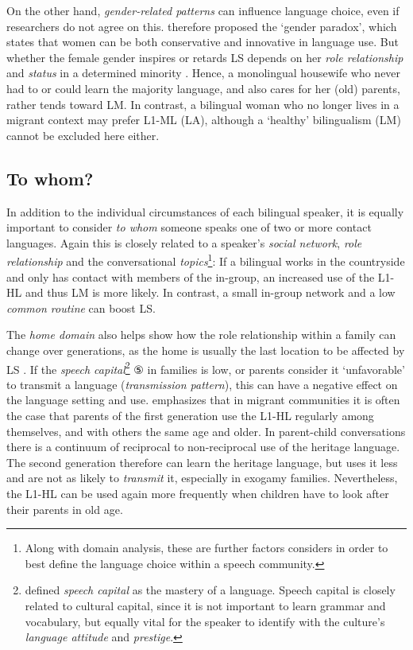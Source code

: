 \documentclass[output=paper,
modfonts
]{langscibook}
\begin{document}
On the other hand, \emph{gender-related patterns} can influence language choice, even if researchers do not agree on this. \cite[213-215]{Labov1990} therefore proposed the ‘gender paradox', which states that women can be both conservative and innovative in language use. But whether the female gender inspires or retards LS depends on her \emph{role relationship} and \emph{status} in a determined minority \parencite[86-88]{Pauwels2016}. Hence, a monolingual housewife who never had to or could learn the majority language, and also cares for her (old) parents, rather tends toward LM. In contrast, a bilingual woman who no longer lives in a migrant context may prefer L1-ML (LA), although a ‘healthy' bilingualism (LM) cannot be excluded here either.


\subsection*{To whom?}

In addition to the individual circumstances of each bilingual speaker, it is equally important to consider \emph{to whom} someone speaks one of two or more contact languages. Again this is closely related to a speaker's \emph{social network}, \emph{role relationship} and the conversational \emph{topics}\footnote{Along with domain analysis, these are further factors \cite{Fishman1964} considers in order to best define the language choice within a speech community.}: If a bilingual works in the countryside and only has contact with members of the in-group, an increased use of the L1-HL and thus LM is more likely. In contrast, a small in-group network and a low \emph{common routine} can boost LS. 

The \emph{home domain} also helps show how the role relationship within a family can change over generations, as the home is usually the last location to be affected by LS \parencite[616]{Heinrich2015}. If the \emph{speech capital}\footnote{\cite[18]{Bourdieu1977} defined \emph{speech capital} as the mastery of a language. Speech capital is closely related to cultural capital, since it is not  important to learn grammar and vocabulary, but equally vital for the speaker to identify with the culture’s \emph{language attitude} and \emph{prestige}.} ⑤ in families is low, or parents consider it `unfavorable' to transmit a language (\emph{transmission pattern}), this can have a negative effect on the language setting and use. \cite[84-89]{Pauwels2016} emphasizes that in migrant communities it is often the case that parents of the first generation use the L1-HL regularly among themselves, and with others the same age and older. In parent-child conversations there is a continuum of reciprocal to non-reciprocal use of the heritage language. The second generation therefore can learn the heritage language, but uses it less and are not as likely to \emph{transmit} it, especially in exogamy families. Nevertheless, the L1-HL can be used again more frequently when children have to look after their parents in old age.
\end{document}
